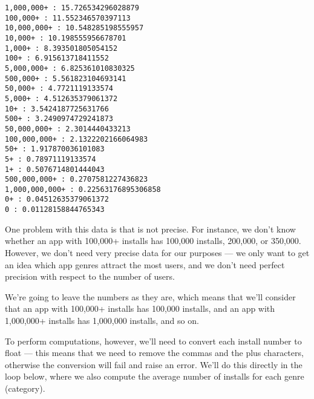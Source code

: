 \documentclass[11pt]{article}
\begin{document}
    \begin{Verbatim}[commandchars=\\\{\}]
1,000,000+ : 15.726534296028879
100,000+ : 11.552346570397113
10,000,000+ : 10.548285198555957
10,000+ : 10.198555956678701
1,000+ : 8.393501805054152
100+ : 6.915613718411552
5,000,000+ : 6.825361010830325
500,000+ : 5.561823104693141
50,000+ : 4.7721119133574
5,000+ : 4.512635379061372
10+ : 3.5424187725631766
500+ : 3.2490974729241873
50,000,000+ : 2.3014440433213
100,000,000+ : 2.1322202166064983
50+ : 1.917870036101083
5+ : 0.78971119133574
1+ : 0.5076714801444043
500,000,000+ : 0.2707581227436823
1,000,000,000+ : 0.22563176895306858
0+ : 0.04512635379061372
0 : 0.01128158844765343

    \end{Verbatim}

    One problem with this data is that is not precise. For instance, we
don't know whether an app with 100,000+ installs has 100,000 installs,
200,000, or 350,000. However, we don't need very precise data for our
purposes --- we only want to get an idea which app genres attract the
most users, and we don't need perfect precision with respect to the
number of users.

    We're going to leave the numbers as they are, which means that we'll
consider that an app with 100,000+ installs has 100,000 installs, and an
app with 1,000,000+ installs has 1,000,000 installs, and so on.

    To perform computations, however, we'll need to convert each install
number to float --- this means that we need to remove the commas and the
plus characters, otherwise the conversion will fail and raise an error.
We'll do this directly in the loop below, where we also compute the
average number of installs for each genre (category).
\end{document}
